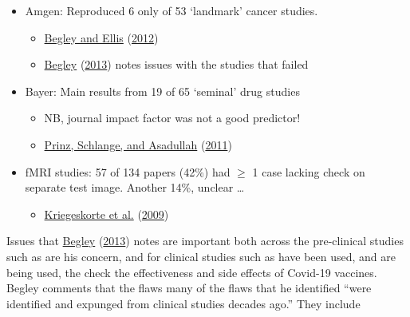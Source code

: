 \documentclass[
  10pt,
  b5paper]{book}
\providecommand{\tightlist}{%
  \setlength{\itemsep}{0pt}\setlength{\parskip}{0pt}}
\begin{document}
\begin{itemize}
\tightlist
\item
  Amgen: Reproduced 6 only of 53 `landmark' cancer studies.

  \begin{itemize}
  \tightlist
  \item
    \protect\hyperlink{ref-r23_begley_ellis_2012}{Begley and Ellis} (\protect\hyperlink{ref-r23_begley_ellis_2012}{2012})
  \item
    \protect\hyperlink{ref-r2_begley_2013}{Begley} (\protect\hyperlink{ref-r2_begley_2013}{2013}) notes issues with the studies that failed
  \end{itemize}
\item
  Bayer: Main results from 19 of 65 `seminal' drug studies

  \begin{itemize}
  \tightlist
  \item
    NB, journal impact factor was not a good predictor!
  \item
    \protect\hyperlink{ref-r9_prinz_schlange_asadullah_2011}{Prinz, Schlange, and Asadullah} (\protect\hyperlink{ref-r9_prinz_schlange_asadullah_2011}{2011})
  \end{itemize}
\item
  fMRI studies: 57 of 134 papers (42\%) had \(\geq\) 1 case lacking
  check on separate test image.
  Another 14\%, unclear \ldots{}

  \begin{itemize}
  \tightlist
  \item
    \protect\hyperlink{ref-r8_kriegeskorte_simmons_bellgowan_baker_2009}{Kriegeskorte et al.} (\protect\hyperlink{ref-r8_kriegeskorte_simmons_bellgowan_baker_2009}{2009})
  \end{itemize}
\end{itemize}

Issues that \protect\hyperlink{ref-r2_begley_2013}{Begley} (\protect\hyperlink{ref-r2_begley_2013}{2013}) notes are important both across
the pre-clinical studies such as are his concern, and for
clinical studies such as have been used, and are being used,
the check the effectiveness and side effects of Covid-19
vaccines. Begley comments that the flaws many of the
flaws that he identified ``were identified and expunged from
clinical studies decades ago.'' They include
\end{document}
